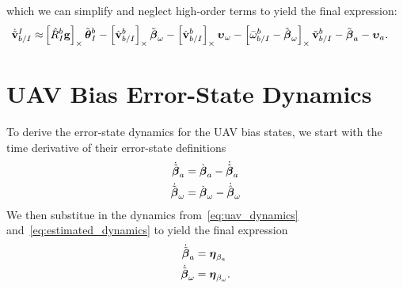 which we can simplify and neglect high-order terms to yield the final
expression:
\begin{align}
  \dot{\tilde{\boldsymbol{\mathrm{v}}}}_{b/I}^I
  \approx&
  \left[  \hat{R}_I^b \boldsymbol{\mathrm{g}}  \right]_{\times} \tilde{\boldsymbol{\mathrm{\theta}}}_I^b 
  -
  \left[  \hat{\boldsymbol{\mathrm{v}}}_{b/I}^b  \right]_{\times} \tilde{\boldsymbol{\mathrm{\beta}}}_\omega
  -
  \left[  \hat{\boldsymbol{\mathrm{v}}}_{b/I}^b  \right]_{\times} \boldsymbol{\mathrm{\upsilon}}_\omega
  -
  \left[  \bar{\omega}_{b/I}^b - \hat{\boldsymbol{\mathrm{\beta}}}_\omega  \right]_{\times}
  \tilde{\boldsymbol{\mathrm{v}}}_{b/I}^b
  -
  \tilde{\boldsymbol{\mathrm{\beta}}}_a
  -
  \boldsymbol{\mathrm{\upsilon}}_a.
\end{align}

\section{UAV Bias Error-State Dynamics}
To derive the error-state dynamics for the UAV bias states, we start with the
time derivative of their error-state definitions
\begin{align}
  \dot{\tilde{\boldsymbol{\mathrm{\beta}}}}_a &= \dot{\boldsymbol{\mathrm{\beta}}}_a -
  \dot{\hat{\boldsymbol{\mathrm{\beta}}}}_a \\
  \dot{\tilde{\boldsymbol{\mathrm{\beta}}}}_\omega &= \dot{\boldsymbol{\mathrm{\beta}}}_\omega -
  \dot{\hat{\boldsymbol{\mathrm{\beta}}}}_\omega
\end{align}
We then substitue in the dynamics from~\eqref{eq:uav_dynamics}
and~\eqref{eq:estimated_dynamics} to yield the final expression
\begin{align}
  \dot{\tilde{\boldsymbol{\mathrm{\beta}}}}_a &= \boldsymbol{\mathrm{\eta}}_{\beta_a} \\
  \dot{\tilde{\boldsymbol{\mathrm{\beta}}}}_\omega &= \boldsymbol{\mathrm{\eta}}_{\beta_\omega}.
\end{align}

